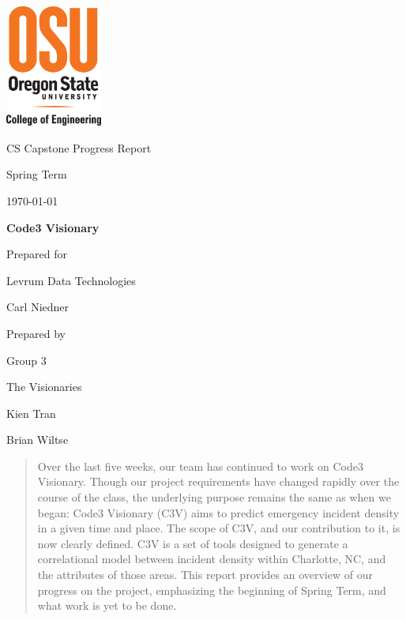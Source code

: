 \documentclass[onecolumn, draftclsnofoot,10pt, compsoc]{IEEEtran}
\def \CapstoneTeamName{   The Visionaries}
\def \CapstoneTeamNumber{   3}
\def \GroupMemberOne{     Kien Tran}
\def \GroupMemberTwo{       Brian Wiltse}
\def \CapstoneProjectName{    Code3 Visionary}
\def \CapstoneSponsorCompany{ Levrum Data Technologies}
\def \CapstoneSponsorPerson{  Carl Niedner}
\def \DocType{    
        Progress Report
        }
\newcommand{\NameSigPair}[1]{\par
\makebox[2.75in][r]{#1} \hfil   \makebox[3.25in]{\makebox[2.25in]{\hrulefill} \hfill    \makebox[.75in]{\hrulefill}}
\par\vspace{-12pt} \textit{\tiny\noindent
\makebox[2.75in]{} \hfil    \makebox[3.25in]{\makebox[2.25in][r]{Signature} \hfill  \makebox[.75in][r]{Date}}}}
\renewcommand{\NameSigPair}[1]{#1}
\begin{document}
\begin{titlepage}
    \begin{singlespace}
      \includegraphics[height=4cm]{coe_v_spot1}
        \hfill 
        \par\vspace{.2in}
        \centering
        \scshape{
            \huge CS Capstone \DocType \par
            \large{Spring Term}\par
            {\large\today}\par
            \vspace{.5in}
            \textbf{\Huge\CapstoneProjectName}\par
            \vfill
            {\large Prepared for}\par
            \Huge \CapstoneSponsorCompany\par
            \vspace{5pt}
            {\Large\NameSigPair{\CapstoneSponsorPerson}\par}
            {\large Prepared by }\par
            Group\CapstoneTeamNumber\par
            \CapstoneTeamName\par 
            \vspace{5pt}
            {\Large
                \NameSigPair{\GroupMemberOne}\par
                \NameSigPair{\GroupMemberTwo}\par
            }
            \vspace{20pt}
        }
        \begin{abstract}
                Over the last five weeks, our team has continued to work on Code3 Visionary.
                Though our project requirements have changed rapidly over the course of the class, the underlying purpose remains the same as when we began: Code3 Visionary (C3V) aims to predict emergency incident density in a given time and place. 
                The scope of C3V, and our contribution to it, is now clearly defined. 
                C3V is a set of tools designed to generate a correlational model between incident density within Charlotte, NC, and the attributes of those areas.
                This report provides an overview of our progress on the project, emphasizing the beginning of Spring Term, and what work is yet to be done. 
        \end{abstract}
    \end{singlespace}
\end{titlepage}
\end{document}
